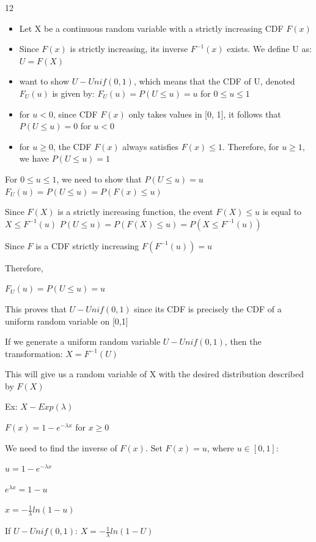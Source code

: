 \documentclass[12 pt]{article}
\begin{document}
    \begin{exercise}{12}
    \hfill

    \begin{itemize}
        \item Let X be a continuous random variable with a strictly increasing CDF $F(x)$
        \item Since $F(x)$ is strictly increasing, its inverse $F^{-1}(x)$ exists. We define U as:
        $U = F(X)$
        \item want to show $U - Unif(0,1)$, which means that the CDF of U, denoted $F_U(u)$ is given by: 
        $F_U(u) = P(U \leq u) = u$ for $0 \leq u \leq 1$
        \item for $u < 0$, since CDF $F(x)$ only takes values in [0, 1], it follows that $P(U \leq u) = 0$ for $u < 0$
        \item for $u \geq 0$, the CDF $F(x)$ always satisfies $F(x) \leq 1$. Therefore, for $u \geq 1$, we have $P(U \leq u) = 1$
    \end{itemize}

    For $0 \leq u \leq 1$, we need to show that $P(U \leq u) = u$
    $F_U(u) = P(U \leq u) = P(F(x) \leq u)$

    \hfill

    Since $F(X)$ is a strictly increasing function, the event $F(X) \leq u$ is equal to $X \leq F^{-1}(u)$
    $P(U \leq u) = P(F(X) \leq u) = P(X \leq F^{-1}(u))$

    \hfill

    Since $F$ is a CDF strictly increasing
    $F(F^{-1}(u)) = u$

    \hfill

    Therefore, 

    $F_U(u) = P(U \leq u) = u$

    This proves that $U - Unif(0,1)$ since its CDF is precisely the CDF of a uniform random variable on [0,1]

    \hfill

    If we generate a uniform random variable $U - Unif(0,1)$, then the transformation:
    $X = F^{-1}(U)$

    This will give us a random variable of X with the desired distribution described by $F(X)$

    Ex: $X - Exp(\lambda)$

    $F(x) = 1 - e^{- \lambda x}$ for $x \geq 0$

    \hfill

    We need to find the inverse of $F(x)$. Set $F(x) = u$, where $u \in [0,1]$:

    $u = 1 - e^{-\lambda x}$

    $e^{\lambda x} = 1- u$

    $x = - \frac{1}{\lambda} ln(1-u)$

    If $U - Unif(0,1)$: $X = -\frac{1}{\lambda} ln(1-U)$

    \hfill
    \end{exercise}
\end{document}
